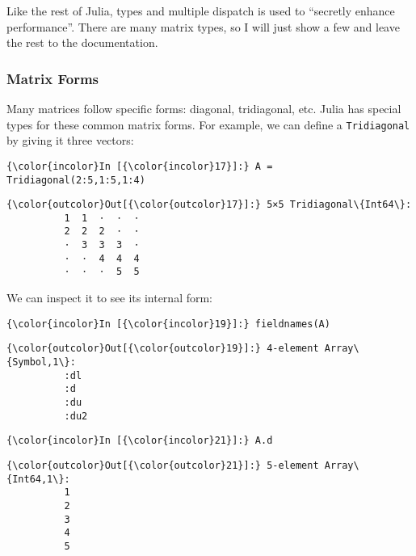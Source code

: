 \documentclass[11pt]{article}
\begin{document}
    Like the rest of Julia, types and multiple dispatch is used to
``secretly enhance performance''. There are many matrix types, so I will
just show a few and leave the rest to the documentation.

\subsubsection{Matrix Forms}\label{matrix-forms}

Many matrices follow specific forms: diagonal, tridiagonal, etc. Julia
has special types for these common matrix forms. For example, we can
define a \texttt{Tridiagonal} by giving it three vectors:

    \begin{Verbatim}[commandchars=\\\{\}]
{\color{incolor}In [{\color{incolor}17}]:} A = Tridiagonal(2:5,1:5,1:4)
\end{Verbatim}

            \begin{Verbatim}[commandchars=\\\{\}]
{\color{outcolor}Out[{\color{outcolor}17}]:} 5×5 Tridiagonal\{Int64\}:
          1  1  ⋅  ⋅  ⋅
          2  2  2  ⋅  ⋅
          ⋅  3  3  3  ⋅
          ⋅  ⋅  4  4  4
          ⋅  ⋅  ⋅  5  5
\end{Verbatim}
        
    We can inspect it to see its internal form:

    \begin{Verbatim}[commandchars=\\\{\}]
{\color{incolor}In [{\color{incolor}19}]:} fieldnames(A)
\end{Verbatim}

            \begin{Verbatim}[commandchars=\\\{\}]
{\color{outcolor}Out[{\color{outcolor}19}]:} 4-element Array\{Symbol,1\}:
          :dl 
          :d  
          :du 
          :du2
\end{Verbatim}
        
    \begin{Verbatim}[commandchars=\\\{\}]
{\color{incolor}In [{\color{incolor}21}]:} A.d
\end{Verbatim}

            \begin{Verbatim}[commandchars=\\\{\}]
{\color{outcolor}Out[{\color{outcolor}21}]:} 5-element Array\{Int64,1\}:
          1
          2
          3
          4
          5
\end{Verbatim}
        
\end{document}
